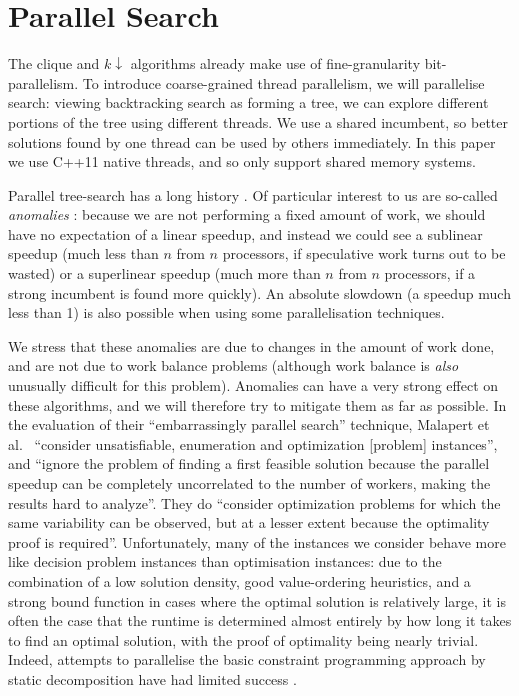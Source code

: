 \documentclass{llncs}
\begin{document}
\section{Parallel Search}

The clique and $k{\downarrow}$ algorithms already make use of fine-granularity bit-parallelism. To
introduce coarse-grained thread parallelism, we will parallelise search: viewing backtracking search
as forming a tree, we can explore different portions of the tree using different threads. We use a
shared incumbent, so better solutions found by one thread can be used by others immediately. In this
paper we use C++11 native threads, and so only support shared memory systems.

Parallel tree-search has a long history \cite{o:BaderHC05}. Of particular interest to us are
so-called \emph{anomalies}
\cite{DBLP:journals/cacm/LaiS84,DBLP:journals/tc/LiW86,DBLP:conf/irregular/BruinKT95}: because we
are not performing a fixed amount of work, we should have no expectation of a linear speedup, and
instead we could see a sublinear speedup (much less than $n$ from $n$ processors, if speculative
work turns out to be wasted) or a superlinear speedup (much more than $n$ from $n$ processors, if a
strong incumbent is found more quickly). An absolute slowdown (a speedup much less than 1) is also
possible when using some parallelisation techniques.

We stress that these anomalies are due to changes in the amount of work done, and are not due to
work balance problems (although work balance is \emph{also} unusually difficult for this problem).
Anomalies can have a very strong effect on these algorithms, and we will therefore try to mitigate
them as far as possible. In the evaluation of their ``embarrassingly parallel search'' technique,
Malapert et al.\ \cite{DBLP:journals/jair/MalapertRR16} ``consider unsatisfiable, enumeration and
optimization [problem] instances'', and ``ignore the problem of finding a first feasible solution
because the parallel speedup can be completely uncorrelated to the number of workers, making the
results hard to analyze''. They do ``consider optimization problems for which the same variability
can be observed, but at a lesser extent because the optimality proof is required''. Unfortunately,
many of the instances we consider behave more like decision problem instances than optimisation
instances: due to the combination of a low solution density, good value-ordering heuristics, and a
strong bound function in cases where the optimal solution is relatively large, it is often the case
that the runtime is determined almost entirely by how long it takes to find an optimal solution,
with the proof of optimality being nearly trivial.  Indeed, attempts to parallelise the basic
constraint programming approach by static decomposition have had limited success
\cite{DBLP:conf/ictai/MinotNS15}.
\end{document}
